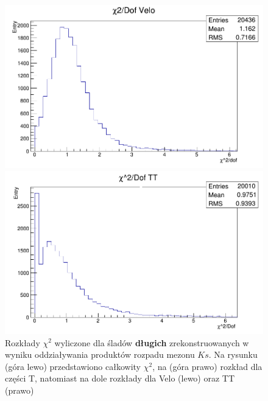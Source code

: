 \begin{figure}[h]
\vspace*{0.5cm} %
\begin{minipage}[t]{0.45\textwidth}
\includegraphics[width=\linewidth]{rozdzial6/KsLL_chi2Velo.png}
\end{minipage}
\hspace{\fill}
\begin{minipage}[t]{0.45\textwidth}
\includegraphics[width=\linewidth]{rozdzial6/KsLL_chi2TT.png}
\end{minipage}
\caption{Rozkłady $\chi^2$ wyliczone dla śladów \textbf{długich} zrekonstruowanych w wyniku oddziaływania produktów rozpadu mezonu $Ks$. Na rysunku (góra lewo) przedstawiono całkowity $\chi^2$, na (góra prawo) rozkład dla części T, natomiast na dole rozkłady dla Velo (lewo) oraz TT (prawo) } \label{chi2KsLL}
\end{figure}

